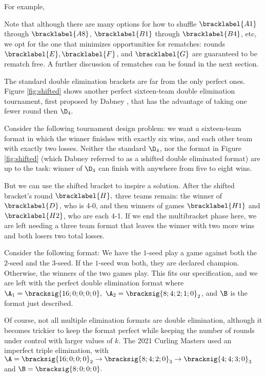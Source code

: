 {    For example,


    Note that although there are many options for how to shuffle $\bracklabel{A1}$ through $\bracklabel{A8}$, $\bracklabel{B1}$ through $\bracklabel{B4}$, etc, we opt for the one that minimizes opportunities for rematches: rounds $\bracklabel{E}, \bracklabel{F}$, and $\bracklabel{G}$ are guaranteed to be rematch free. A further discussion of rematches can be found in the next section.

    The standard double elimination brackets are far from the only perfect ones. Figure \ref{fig:shifted} shows another perfect sixteen-team double elimination tournament, first proposed by Dabney \cite{shifted}, that has the advantage of taking one fewer round then $\D_4.$


    Consider the following tournament design problem: we want a sixteen-team format in which the winner finishes with exactly six wins, and each other team with exactly two losses. Neither the standard $\D_4$, nor the format in Figure \ref{fig:shifted} (which Dabney referred to as a \i{shifted} double eliminated format) are up to the task: winner of $\D_4$ can finish with anywhere from five to eight wins.

    But we can use the shifted bracket to inspire a solution. After the shifted bracket's round $\bracklabel{H},$ three teams remain: the winner of $\bracklabel{D}$, who is 4-0, and then winners of games $\bracklabel{H1}$ and $\bracklabel{H2}$, who are each 4-1. If we end the multibracket phase here, we are left needing a three team format that leaves the winner with two more wins and both losers two total losses.

    Consider the following format: We have the $1$-seed play a game against both the $2$-seed and the $3$-seed. If the $1$-seed won both, they are declared champion. Otherwise, the winners of the two games play. This fits our specification, and we are left with the perfect double elimination format where $\A_1 = \bracksig{16;0;0;0;0},\ \A_2 = \bracksig{8;4;2;1;0}_2$, and $\B$ is the format just described.
    

    Of course, not all multiple elimination formats are double elimination, although it becomes trickier to keep the format perfect while keeping the number of rounds under control with larger values of $k$. The 2021 Curling Masters used an imperfect triple elimination, with $\A = \bracksig{16;0;0;0}_2 \to \bracksig{8;4;2;0}_3 \to \bracksig{4;4;3;0}_3$ and $\B = \bracksig{8;0;0;0}.$

}
